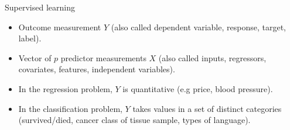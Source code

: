 \documentclass[aspectratio=169,dvipsnames]{beamer}
\begin{document}
\begin{frame}[c]{Supervised learning}

\begin{itemize}
	\item Outcome measurement $Y$ (also called dependent variable, response, target, label).

\item
Vector of $p$ predictor measurements $X$ (also called inputs, regressors, covariates, features, independent variables).

\item
In the regression problem, $Y$ is quantitative (e.g price, blood pressure).

\item
In the classification problem, $Y$ takes values in a set of distinct categories (survived/died, cancer class of tissue sample, types of language).
\end{itemize}
\begin{columns}
\centering

\centering

\end{columns}

\end{frame}
\end{document}
